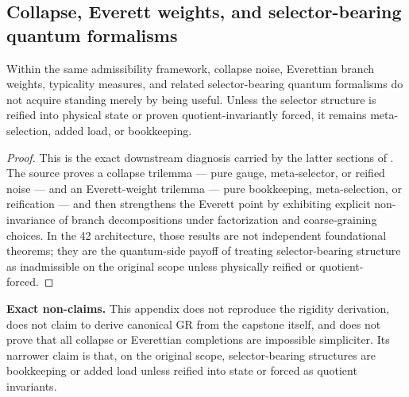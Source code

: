 \subsection*{Collapse, Everett weights, and selector-bearing quantum formalisms}

\begin{proposition}
Within the same admissibility framework, collapse noise, Everettian branch weights, typicality measures, and related selector-bearing quantum formalisms do not acquire standing merely by being useful. Unless the selector structure is reified into physical state or proven quotient-invariantly forced, it remains meta-selection, added load, or bookkeeping.
\end{proposition}

\begin{proof}
This is the exact downstream diagnosis carried by the latter sections of \gaugeconstraintdoc{}. The source proves a collapse trilemma --- pure gauge, meta-selector, or reified noise --- and an Everett-weight trilemma --- pure bookkeeping, meta-selection, or reification --- and then strengthens the Everett point by exhibiting explicit non-invariance of branch decompositions under factorization and coarse-graining choices. In the 42 architecture, those results are not independent foundational theorems; they are the quantum-side payoff of treating selector-bearing structure as inadmissible on the original scope unless physically reified or quotient-forced.\cite{MaleyGaugeConstraintDynamics}
\end{proof}

\begin{reviewbox}
\textbf{Exact non-claims.} This appendix does not reproduce the rigidity derivation, does not claim to derive canonical GR from the capstone itself, and does not prove that all collapse or Everettian completions are impossible simpliciter. Its narrower claim is that, on the original scope, selector-bearing structures are bookkeeping or added load unless reified into state or forced as quotient invariants.\cite{MaleyGaugeConstraintDynamics}
\end{reviewbox}
